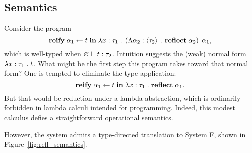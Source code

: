   \subsection{Semantics}

    Consider the program
    \[
      \textbf{reify} \; \alpha_1 \leftarrow t \; \textbf{in} \; \lambda x : \tau_1 \; . \; \left( \Lambda \alpha_2 : \left\langle \tau_2 \right\rangle \; . \; \textbf{reflect} \; \alpha_2 \right) \; \alpha_1,
    \]
    which is well-typed when $\varnothing \vdash t : \tau_2$. Intuition suggests the (weak) normal form $\lambda x : \tau_1 \; . \; t$. What might be the first step this program takes toward that normal form? One is tempted to eliminate the type application:
    \[
      \textbf{reify} \; \alpha_1 \leftarrow t \; \textbf{in} \; \lambda x : \tau_1 \; . \; \textbf{reflect} \; \alpha_1.
    \]
    But that would be reduction under a lambda abstraction, which is ordinarily forbidden in lambda calculi intended for programming. Indeed, this modest calculus defies a straightforward operational semantics.

    However, the system admits a type-directed translation to System F, shown in Figure~\ref{fig:refl_semantics}.

